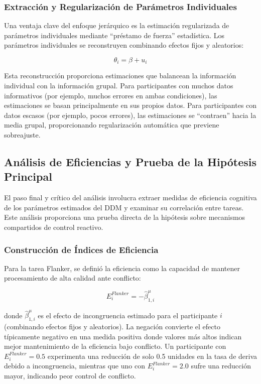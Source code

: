 \documentclass[
  spanish,
  10pt,
]{article}
\begin{document}
\subsubsection{Extracción y Regularización de Parámetros
Individuales}\label{extracciuxf3n-y-regularizaciuxf3n-de-paruxe1metros-individuales}

Una ventaja clave del enfoque jerárquico es la estimación regularizada
de parámetros individuales mediante ``préstamo de fuerza'' estadística.
Los parámetros individuales se reconstruyen combinando efectos fijos y
aleatorios:

\[\theta_i = \beta + u_i\]

Esta reconstrucción proporciona estimaciones que balancean la
información individual con la información grupal. Para participantes con
muchos datos informativos (por ejemplo, muchos errores en ambas
condiciones), las estimaciones se basan principalmente en sus propios
datos. Para participantes con datos escasos (por ejemplo, pocos
errores), las estimaciones se ``contraen'' hacia la media grupal,
proporcionando regularización automática que previene sobreajuste.

\subsection{Análisis de Eficiencias y Prueba de la Hipótesis
Principal}\label{anuxe1lisis-de-eficiencias-y-prueba-de-la-hipuxf3tesis-principal}

El paso final y crítico del análisis involucra extraer medidas de
eficiencia cognitiva de los parámetros estimados del DDM y examinar su
correlación entre tareas. Este análisis proporciona una prueba directa
de la hipótesis sobre mecanismos compartidos de control reactivo.

\subsubsection{Construcción de Índices de
Eficiencia}\label{construcciuxf3n-de-uxedndices-de-eficiencia}

Para la tarea Flanker, se definió la eficiencia como la capacidad de
mantener procesamiento de alta calidad ante conflicto:

\[E_i^{Flanker} = -\hat{\beta}_{1,i}^{\mu}\]

donde \(\hat{\beta}_{1,i}^{\mu}\) es el efecto de incongruencia estimado
para el participante \(i\) (combinando efectos fijos y aleatorios). La
negación convierte el efecto típicamente negativo en una medida positiva
donde valores más altos indican mejor mantenimiento de la eficiencia
bajo conflicto. Un participante con \(E_i^{Flanker} = 0.5\) experimenta
una reducción de solo 0.5 unidades en la tasa de deriva debido a
incongruencia, mientras que uno con \(E_i^{Flanker} = 2.0\) sufre una
reducción mayor, indicando peor control de conflicto.
\end{document}
